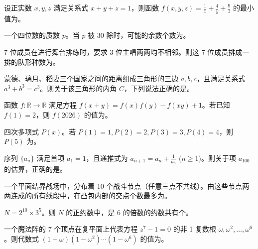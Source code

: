 
\begin{questions}
  \item 设正实数 $x, y, z$ 满足关系式 $x+y+z=1$，则函数 $f(x,y,z) = \frac{1}{x} + \frac{4}{y} + \frac{9}{z}$ 的最小值为\answerline[15mm]。
  \item 一个四位数的质数 $p$。当 $p$ 被 30 除时，可能的余数个数为\answerline[15mm]。
  \item 7 位成员在进行舞台排练时，要求 3 位主唱两两均不相邻。则这 7 位成员排成一排的队形种数为\answerline[15mm]。
  \item 蒙德、璃月、稻妻三个国家之间的距离组成三角形的三边 $a, b, c$，且满足关系式 $a^3 + b^3 = c^3$。则关于该三角形的内角 $C$，下列说法正确的是\answerline[15mm]。
  \item 函数 $f: \mathbb{R} \to \mathbb{R}$ 满足方程 $f(x+y) = f(x)f(y) - f(xy) + 1$。若已知 $f(1) = 2$，则 $f(2026)$ 的值为\answerline[15mm]。
  \item 四次多项式 $P(x)$。若 $P(1) = 1, P(2) = 2, P(3) = 3, P(4) = 4$，则 $P(5)$ 为\answerline[15mm]。
  \item 序列 $\{a_n\}$ 满足首项 $a_1 = 1$，且递推式为 $a_{n+1} = a_n + \frac{1}{a_n}$ ($n \ge 1$)。则关于项 $a_{100}$ 的估算，正确的是\answerline[15mm]。
  \item 一个平面结界战场中，分布着 10 个战斗节点（任意三点不共线）。由这些节点两两连成的所有线段中，在凸包内部的交点个数最多为\answerline[15mm]。
  \item  $N = 2^{10} \times 3^5$。则 $N$ 的正约数中，是 6 的倍数的约数共有\answerline[15mm] 个。
  \item 一个魔法阵的 7 个顶点在复平面上代表方程 $z^7 - 1 = 0$ 的非 1 复数根 $\omega, \omega^2, \dots, \omega^6$。则代数式 $(1-\omega)(1-\omega^2)\cdots(1-\omega^6)$ 的值为\answerline[15mm]。
\end{questions}

